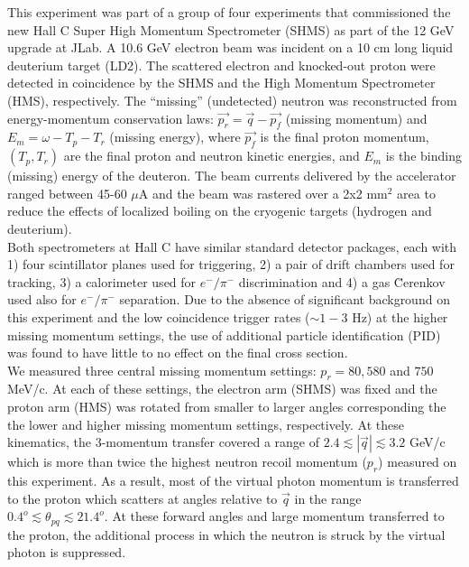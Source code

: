 \indent This experiment was part of a group of four experiments that commissioned the new Hall C Super High Momentum Spectrometer (SHMS) as part of the 12 GeV upgrade at JLab.
A 10.6 GeV electron beam was incident on a 10 cm long liquid deuterium target (LD2). The scattered electron and knocked-out proton were detected in coincidence
by the SHMS and the High Momentum Spectrometer (HMS), respectively. The ``missing'' (undetected) neutron was reconstructed from energy-momentum conservation laws:
$\vec{p_{r}} = \vec{q} - \vec{p_{f}}$ (missing momentum) and $E_{m} = \omega - T_{p} - T_{r}$ (missing energy), where $\vec{p_{f}}$ is the final proton momentum, $(T_{p}, T_{r})$ are the
final proton and neutron kinetic energies, and $E_{m}$ is the binding (missing) energy of the deuteron.
The beam currents delivered by the accelerator ranged between 45-60 $\mu$A and the beam was rastered over a 2x2 mm$^{2}$ area to reduce the effects of localized boiling on the cryogenic targets (hydrogen and deuterium). \\
\indent Both spectrometers at Hall C have similar standard detector packages, each with 1) four scintillator planes\cite{hodo_techreport} used for triggering,
2) a pair of drift chambers\cite{dc_techreport} used for tracking, 3) a calorimeter\cite{Mkrtchyan_2013} used for $e^{-}/\pi^{-}$ discrimination and 4) a gas \u{C}erenkov \cite{Li_Wenliang_mthesis,ngc_techreport} used also for $e^{-}/\pi^{-}$ separation.
Due to the absence of significant background on this experiment and the low coincidence trigger rates
($\sim 1-3$ Hz) at the higher missing momentum settings, the use of additional particle identification (PID) was found to have little to no effect on the final cross section. \\
\indent We measured three central missing momentum settings: $p_{r}=80,580$ and $750$ MeV/c. At each of these settings, the electron arm (SHMS) was fixed and the proton arm (HMS) was rotated from smaller to larger angles corresponding the
the lower and higher missing momentum settings, respectively. At these kinematics, the 3-momentum transfer covered a range of $2.4\lesssim|\vec{q}|\lesssim3.2$ GeV/c which is more than twice the highest neutron recoil momentum ($p_{r}$)
measured on this experiment. As a result, most of the virtual photon momentum is transferred to the proton which scatters at angles relative to $\vec{q}$ in the range $0.4^{o}\lesssim \theta_{pq}\lesssim21.4^{o}$.
At these forward angles and large momentum transferred to the proton, the additional process in which the neutron is struck by the virtual photon is suppressed. \\
